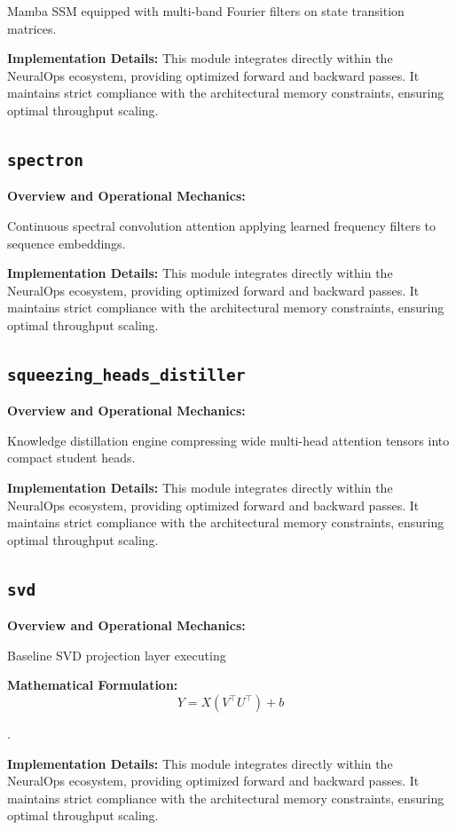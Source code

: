 \documentclass[10pt,twocolumn,letterpaper]{article}
\begin{document}
Mamba SSM equipped with multi-band Fourier filters on state transition matrices.

\textbf{Implementation Details:}
This module integrates directly within the NeuralOps ecosystem, providing optimized forward and backward passes. It maintains strict compliance with the architectural memory constraints, ensuring optimal throughput scaling.

\subsection{\texttt{spectron}}
\textbf{Overview and Operational Mechanics:}

Continuous spectral convolution attention applying learned frequency filters to sequence embeddings.

\textbf{Implementation Details:}
This module integrates directly within the NeuralOps ecosystem, providing optimized forward and backward passes. It maintains strict compliance with the architectural memory constraints, ensuring optimal throughput scaling.

\subsection{\texttt{squeezing\_heads\_distiller}}
\textbf{Overview and Operational Mechanics:}

Knowledge distillation engine compressing wide multi-head attention tensors into compact student heads.

\textbf{Implementation Details:}
This module integrates directly within the NeuralOps ecosystem, providing optimized forward and backward passes. It maintains strict compliance with the architectural memory constraints, ensuring optimal throughput scaling.

\subsection{\texttt{svd}}
\textbf{Overview and Operational Mechanics:}

Baseline SVD projection layer executing

\textbf{Mathematical Formulation:}
\begin{equation}
Y = X (V^\top U^\top) + b
\end{equation}

.

\textbf{Implementation Details:}
This module integrates directly within the NeuralOps ecosystem, providing optimized forward and backward passes. It maintains strict compliance with the architectural memory constraints, ensuring optimal throughput scaling.
\end{document}
